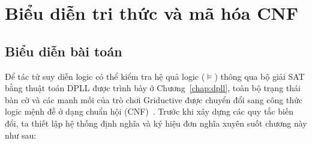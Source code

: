 \chapter{Biểu diễn tri thức và mã hóa CNF}
\label{chap:cnf}

\section{Biểu diễn bài toán}
Để tác tử suy diễn logic có thể kiểm tra hệ quả logic ($\models$) thông qua bộ giải SAT bằng thuật toán DPLL được trình bày ở Chương~\ref{chap:dpll}, toàn bộ trạng thái bàn cờ và các manh mối của trò chơi Griductive được chuyển đổi sang công thức logic mệnh đề ở dạng chuẩn hội (CNF)~\cite{russell2020aima}. Trước khi xây dựng các quy tắc biến đổi, ta thiết lập hệ thống định nghĩa và ký hiệu đơn nghĩa xuyên suốt chương này như sau:

